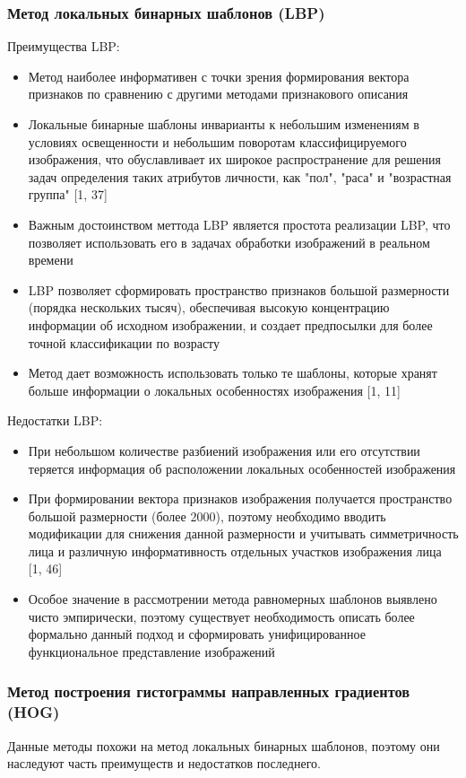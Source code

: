 \documentclass[12pt,a4paper]{article}
\begin{document}
\subsubsection{Метод локальных бинарных шаблонов (LBP)}
Преимущества LBP:
\begin{itemize}
    \item Метод наиболее информативен с точки зрения формирования вектора признаков по сравнению с другими методами признакового описания
    \item Локальные бинарные шаблоны инварианты к небольшим изменениям в условиях освещенности и небольшим поворотам классифицируемого изображения, что обуславливает их широкое распространение для решения задач определения таких атрибутов личности, как "пол", "раса" и "возрастная группа" [1, 37]
    \item Важным достоинством меттода LBP является простота реализации LBP, что позволяет использовать его в задачах обработки изображений в реальном времени
    \item LBP позволяет сформировать пространство признаков большой размерности (порядка нескольких тысяч), обеспечивая высокую концентрацию информации об исходном изображении, и создает предпосылки для более точной классификации по возрасту
    \item Метод дает возможность использовать только те шаблоны, которые хранят больше информации о локальных особенностях изображения [1, 11]
\end{itemize}

Недостатки LBP:
\begin{itemize}
    \item При небольшом количестве разбиений изображения или его отсутствии теряется информация об расположении локальных особенностей изображения
    \item При формировании вектора признаков изображения получается пространство большой размерности (более 2000), поэтому необходимо вводить модификации для снижения данной размерности и учитывать симметричность лица и различную информативность отдельных участков изображения лица [1, 46]
    \item Особое значение в рассмотрении метода равномерных шаблонов выявлено чисто эмпирически, поэтому существует необходимость описать более формально данный подход и сформировать унифицированное функциональное представление изображений
\end{itemize}

\subsubsection{Метод построения гистограммы направленных градиентов (HOG)}
Данные методы похожи на метод локальных бинарных шаблонов, поэтому они наследуют часть преимуществ и недостатков последнего.
\end{document}
